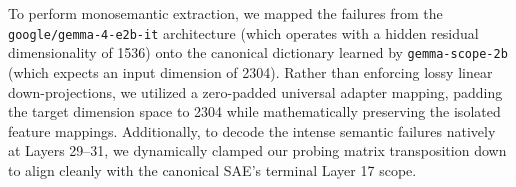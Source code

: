 \documentclass{article}
\begin{document}
To perform monosemantic extraction, we mapped the failures from the \texttt{google/gemma-4-e2b-it} architecture (which operates with a hidden residual dimensionality of 1536) onto the canonical dictionary learned by \texttt{gemma-scope-2b} (which expects an input dimension of 2304). Rather than enforcing lossy linear down-projections, we utilized a zero-padded universal adapter mapping, padding the target dimension space to 2304 while mathematically preserving the isolated feature mappings. Additionally, to decode the intense semantic failures natively at Layers 29--31, we dynamically clamped our probing matrix transposition down to align cleanly with the canonical SAE's terminal Layer 17 scope.
\end{document}

